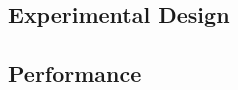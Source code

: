 \subsection{Experimental Design}
  \label{section:experimental}
  

\subsection{Performance}
  \label{section:performance}
  
